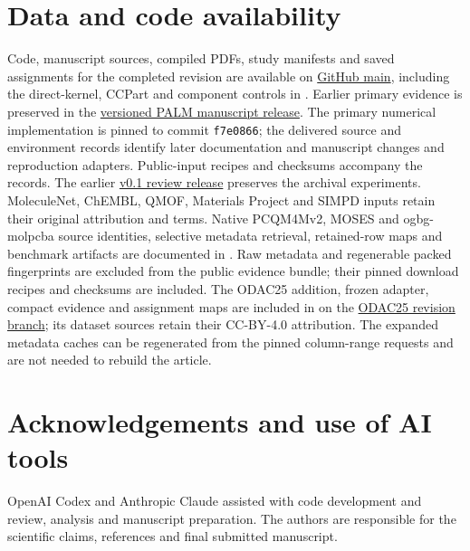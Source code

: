 \documentclass[12pt]{article}
\begin{document}
\section*{Data and code availability}

Code, manuscript sources, compiled PDFs, study manifests and saved assignments
for the completed revision are available on
\href{https://github.com/Ray16/PALM/tree/main/publications/lowrank_2026}{GitHub main},
including the direct-kernel, CCPart and component controls in
. Earlier primary evidence is preserved in the
\href{https://github.com/Ray16/PALM/tree/lowrank-v0.2.0-review-20261026/publications/lowrank_2026}{versioned
PALM manuscript release}. The primary numerical implementation is pinned to
commit \texttt{f7e0866}; the delivered source and environment records identify
later documentation and manuscript changes and reproduction adapters.
Public-input recipes and checksums accompany the records. The earlier
\href{https://github.com/Ray16/PALM/tree/lowrank-v0.1.0-review-20261021-r2/publications/lowrank_2026}{v0.1
review release} preserves the archival experiments. MoleculeNet, ChEMBL, QMOF,
Materials Project and SIMPD inputs retain their original attribution and terms.
Native PCQM4Mv2, MOSES and ogbg-molpcba source identities, selective metadata
retrieval, retained-row maps and benchmark artifacts are documented in
. Raw metadata and regenerable packed
fingerprints are excluded from the public evidence bundle; their pinned
download recipes and checksums are included.
The ODAC25 addition, frozen adapter, compact evidence and assignment maps are
included in  on the
\href{https://github.com/Ray16/PALM/tree/lowrank-odac25-20261103/publications/lowrank_2026}{ODAC25
revision branch}; its dataset sources retain their CC-BY-4.0 attribution. The
expanded metadata caches can be regenerated from the pinned column-range
requests and are not needed to rebuild the article.


\section*{Acknowledgements and use of AI tools}
OpenAI Codex and Anthropic Claude assisted with code development and review,
analysis and manuscript preparation. The authors are responsible for the
scientific claims, references and final submitted manuscript.


\end{document}
